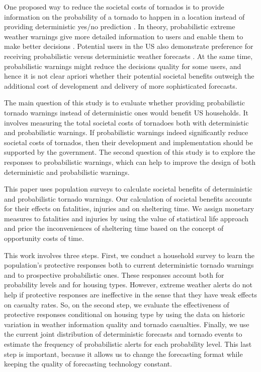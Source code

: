 \documentclass{ametsocV6.1}
\begin{document}
One proposed way to reduce the societal costs of tornados is to provide information on the probability of a tornado to happen in a location instead of providing deterministic yes/no prediction \citep{rothfusz_facets_2018}. In theory, probabilistic extreme weather warnings give more detailed information to users and enable them to make better decisions \citep{murphy_what_1993, papastavrou_improving_1996}.  Potential users in the US also demonstrate preference for receiving probabilistic versus deterministic weather forecasts \citep*{morss_communicating_2008, morss_examining_2010}. At the same time, probabilistic warnings might reduce the decisions quality for some users, and hence it is not clear apriori whether their potential societal benefits outweigh the additional cost of development and delivery of more sophisticated forecasts.

The main question of this study is to evaluate whether providing probabilistic tornado warnings instead of deterministic ones would benefit US households. It involves measuring the total societal costs of tornadoes both with deterministic and probabilistic warnings. If probabilistic warnings indeed significantly reduce societal costs of tornados, then their development and implementation should be supported by the government. The second question of this study is to explore the responses to probabilistic warnings, which can help to improve the design of both deterministic and probabilistic warnings.

This paper uses population surveys to calculate societal benefits of deterministic and probabilistic tornado warnings. Our calculation of societal benefits accounts for their effects on fatalities, injuries and on sheltering time. We assign monetary measures to fatalities and injuries by using the value of statistical life approach and price the inconveniences of sheltering time based on the concept of opportunity costs of time.

This work involves three steps. First, we conduct a household survey to learn the population's protective responses both to current deterministic tornado warnings and to prospective probabilistic ones. These responses account both for probability levels and for housing types. However, extreme weather alerts do not help if protective responses are ineffective in the sense that they have weak effects on casualty rates. So, on the second step, we evaluate the effectiveness of protective responses conditional on housing type by using the data on historic variation in weather information quality and tornado casualties. Finally, we use the current joint distribution of deterministic forecasts and tornado events to estimate the frequency of probabilistic alerts for each probability level. This last step is important, because it allows us to change the forecasting format while keeping the quality of forecasting technology constant.
\end{document}
